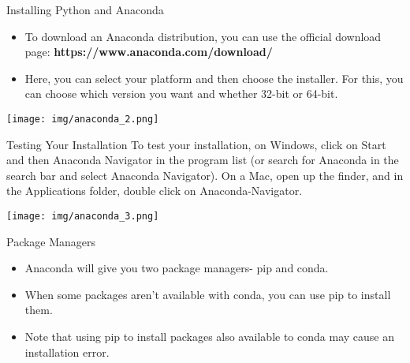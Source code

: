 \documentclass[11pt]{beamer}
\begin{document}
\begin{frame}{Installing Python and Anaconda}
\footnotesize{
\begin{itemize}
\item  To download an Anaconda distribution, you can use the official download page: \textbf{https://www.anaconda.com/download/}
\item Here, you can select your platform and then choose the installer. For this, you can choose which version you want and whether 32-bit or 64-bit.
\end{itemize}}
\normalsize
\begin{center}
\texttt{[image: img/anaconda\_2.png]} 
\end{center}
\end{frame}
\begin{frame}{Testing Your Installation}
To test your installation, on Windows, click on Start and then Anaconda Navigator in the program list (or search for Anaconda in the search bar and select Anaconda Navigator). On a Mac, open up the finder, and in the Applications folder, double click on Anaconda-Navigator.
\begin{center}
\texttt{[image: img/anaconda\_3.png]} 
\end{center}
\end{frame}
%
%
\begin{frame}{Package Managers}
\begin{itemize}
\item  Anaconda will give you two package managers- pip and conda. 

\item When some packages aren’t available with conda, you can use pip to install them. 

\item Note that using pip to install packages also available to conda may cause an installation error.
\end{itemize}
\end{frame}
\end{document}
